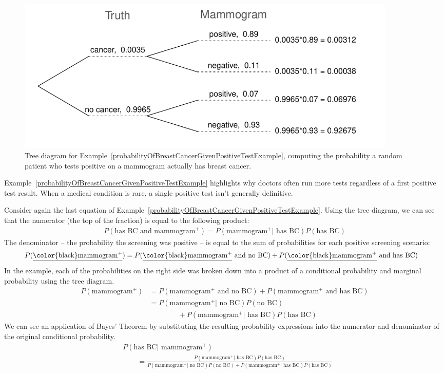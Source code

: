 \begin{figure}[ht]
\centering
\includegraphics[width=0.9\textwidth]{ch_probability/figures/BreastCancerTreeDiagram/BreastCancerTreeDiagram}
\caption{Tree diagram for Example~\ref{probabilityOfBreastCancerGivenPositiveTestExample}, computing the probability a random patient who tests positive on a mammogram actually has breast cancer.}
\label{BreastCancerTreeDiagram}
\end{figure}

Example~\ref{probabilityOfBreastCancerGivenPositiveTestExample} highlights why doctors often run more tests regardless of a first positive test result. When a medical condition is rare, a single positive test isn't generally definitive.

\D{\newpage}

Consider again the last equation of Example~\ref{probabilityOfBreastCancerGivenPositiveTestExample}.
Using the tree diagram, we can see that the numerator (the top of the fraction) is equal to the following product:
\begin{align*}
P(\text{has BC and mammogram$^+$}) = P(\text{mammogram$^+$} | \text{ has BC})P(\text{has BC})
\end{align*}
The denominator -- the probability the screening was positive -- is equal to the sum of probabilities for each positive screening scenario:
\begin{align*}
P(\text{\underline{\color{black}mammogram$^+$}})
	&= P(\text{\underline{\color{black}mammogram$^+$} and no BC})
		+ P(\text{\underline{\color{black}mammogram$^+$} and has BC})
\end{align*}
In the example, each of the probabilities on the right side was broken down into a product of a conditional probability and marginal probability using the tree diagram.
\begin{align*}
P(\text{mammogram$^+$})
	&= P(\text{mammogram$^+$ and no BC}) + P(\text{mammogram$^+$ and has BC}) \\
	&= P(\text{mammogram$^+$} | \text{ no BC})P(\text{no BC}) \\
			   &\qquad\qquad + P(\text{mammogram$^+$} | \text{ has BC})P(\text{has BC})
\end{align*}
We can see an application of Bayes' Theorem by substituting the resulting probability expressions into the numerator and denominator of the original conditional probability.
\begin{align*}
& P(\text{has BC} | \text{ mammogram$^+$})  \\
& \qquad= \frac{P(\text{mammogram$^+$} | \text{ has BC})P(\text{has BC})}
	{P(\text{mammogram$^+$} | \text{ no BC})P(\text{no BC}) + P(\text{mammogram$^+$} | \text{ has BC})P(\text{has BC})}
\end{align*}

